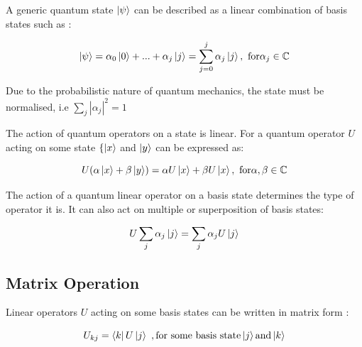 \documentclass{article}
\begin{document}
\noindent
A generic quantum state $\ket{\psi}$ can be described as a linear combination of basis states such as \cite{noauthor_lecture_nodate}:
\vspace{5mm}


\begin{equation}
\ket{\psi} = \alpha_0\ket{0} + ... + \alpha_j\ket{j} = \sum\limits_{j = 0}^{j} \alpha_j\ket{j} , \ \text{for} \alpha_j \in \mathbb{C}
\end{equation}
\vspace{5mm}

\noindent
Due to the probabilistic nature of quantum mechanics, the state must be normalised, i.e $\sum\limits_j |\alpha_j|^2 = 1$
\vspace{5mm}

\noindent
The action of quantum operators on a state is linear. For a quantum operator $U$ acting on some state $\{\ket{x}$ and $\ket{y}$ can be expressed as:
\vspace{5mm}

\noindent
\begin{equation}
U(\alpha\ket{x} + \beta\ket{y}) = \alpha U\ket{x} + \beta U\ket{x} , \ \text{for} \alpha, \beta \in \mathbb{C}
\end{equation}
\vspace{5mm}

\noindent
The action of a quantum linear operator on a basis state determines the type of operator it is. It can also act on multiple or superposition of basis states:
\vspace{5mm}

\noindent
\begin{equation}
U \sum\limits_j \alpha_j \ket{j} = \sum\limits_j \alpha_j U\ket{j}
\end{equation}
\vspace{10mm}

\subsection{Matrix Operation}
\vspace{5mm}

\noindent
Linear operators $U$ acting on some basis states can be written in matrix form \cite{noauthor_lecture_nodate}:
\vspace{5mm}

\begin{equation}
U_{kj} = \bra{k}U\ket{j} \ , \text{for some basis state} \ket{j} \text{and} \ket{k} 
\end{equation}
\vspace{5mm}
\end{document}
